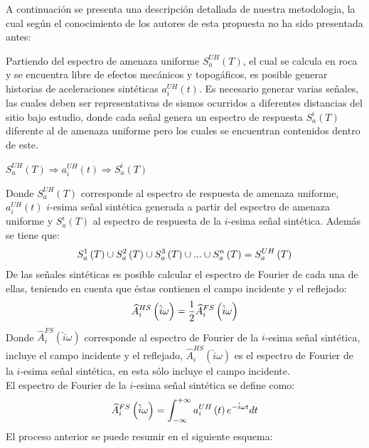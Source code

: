 \documentclass[spanish,letterpaper,12pt,twoside,openany]{article}
\begin{document}
A continuación se presenta una descripción detallada de nuestra metodología, la cual según el conocimiento de los autores de esta propuesta no ha sido presentada antes:

Partiendo del espectro de amenaza uniforme $S_{a}^{UH} \left( T \right)$, el cual se calcula en roca y se encuentra libre de efectos mecánicos y topogáficos, es posible generar historias de aceleraciones sintéticas $a_{i}^{UH}\left( t \right)$. Es necesario generar varias señales, las cuales deben ser representativas de sismos ocurridos a diferentes distancias del sitio bajo estudio, donde cada señal genera un espectro de respuesta $S_{a}^{i} \left( T \right)$ diferente al de amenaza uniforme pero los cuales se encuentran contenidos dentro de este.

	$S_{a}^{UH} \left( T \right) \Rightarrow a_{i}^{UH}\left( t \right) \Rightarrow S_{a}^{i} \left( T \right)$

Donde $S_{a}^{UH} \left( T \right)$ corresponde al espectro de respuesta de amenaza uniforme, $a_{i}^{UH}\left( t \right)$ $i$-esima señal sintética generada a partir del espectro de amenaza uniforme y $S_{a}^{i} \left( T \right)$ al espectro de respuesta de la $i$-esima señal sintética. Además se tiene que:
%
	\begin{align}
		S_{a}^{1} \left( T \right) \cup S_{a}^{2} \left( T \right) \cup S_{a}^{3} \left( T \right) \cup ... \cup S_{a}^{n} \left( T \right) = S_{a}^{UH} \left( T \right)
		\vspace{-1 cm}
	\end{align}	
%
%
De las señales sintéticas es posible calcular el espectro de Fourier de cada una de ellas, teniendo en cuenta que éstas contienen el campo incidente y el reflejado:
%
	\begin{align}\label{eq:espfouhs}
		\widehat{A}^{HS}_{i} \left( \hat{i} \omega \right) = \dfrac{1}{2} \widehat{A}^{FS}_{i} \left( \hat{i} \omega \right)
	\vspace{-1 cm}
	\end{align}
%
Donde $\widehat{A}^{FS}_{i} \left( \hat{i} \omega \right)$ corresponde al espectro de Fourier de la $i$-esima señal sintética, incluye el campo incidente y el reflejado, $\widehat{A}^{HS}_{i} \left( \hat{i} \omega \right)$ es el espectro de Fourier de la $i$-esima señal sintética, en esta sólo incluye el campo incidente.\\
%
El espectro de Fourier de la $i$-esima señal sintética se define como:
%
	\begin{align}\label{eq:fourdirec}
		\widehat{A}^{FS}_{i} \left( \hat{i} \omega \right) = \int_{-\infty}^{+\infty} a_{i}^{UH} \left( t \right) e^{-\hat{i} \omega t} dt 
	\vspace{-1 cm}
	\end{align}
%
El proceso anterior se puede resumir en el siguiente esquema:
\end{document}
